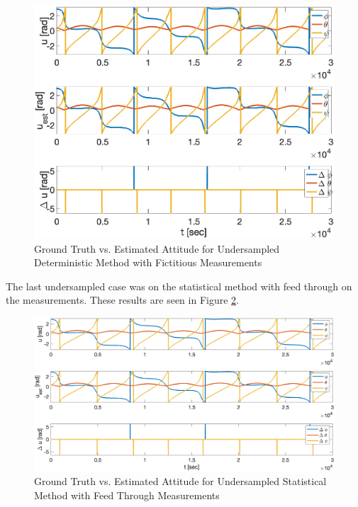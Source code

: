 \begin{figure}[H]
    \centering
    \captionsetup{ justification = centering }
    \includegraphics[width = 12cm]{Images/PS6/attitude_estimation_undersampled_det_fictitious.png}
    \caption{Ground Truth vs. Estimated Attitude for Undersampled Deterministic Method with Fictitious Measurements}
    \label{fig:det_attitude_undersampled_fictitious}
\end{figure}

The last undersampled case was on the statistical method with feed through on the measurements. These results are seen in Figure \ref{fig:stat_attitude_undersampled_default}.

\begin{figure}[H]
    \centering
    \captionsetup{ justification = centering }
    \includegraphics[width = 12cm]{Images/PS6/attitude_estimation_undersampled_q_default.png}
    \caption{Ground Truth vs. Estimated Attitude for Undersampled Statistical Method with Feed Through Measurements}
    \label{fig:stat_attitude_undersampled_default}
\end{figure}

